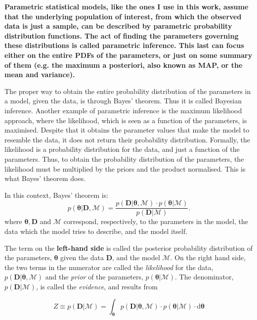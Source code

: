 \textbf{Parametric statistical models, like the ones I use in this work, assume that the underlying population of interest, from which the observed data is just a sample, can be described by parametric probability distribution functions. The act of finding the parameters governing these distributions is called parametric inference. This last can focus either on the entire PDFs of the parameters, or just on some summary of them (e.g. the maximum a posteriori, also known as MAP, or the mean and variance).}

The proper way to obtain the entire probability distribution of the parameters in a model, given the data, is through Bayes' theorem. Thus it is called Bayesian inference. Another example of parametric inference is the maximum likelihood approach, where the likelihood, which is seen as a function of the parameters, is maximised. Despite that it obtains the parameter values that make the model to resemble the data, it does not return their probability distribution. Formally, the likelihood is a probability distribution for the data, and just a function of the parameters. Thus, to obtain the probability distribution of the parameters, the likelihood must be multiplied by the priors and the product normalised. This is what Bayes' theorem does.

In this context, Bayes' theorem is:
\begin{equation}
p(\mathbf{\theta}|\mathbf{D},\mathcal{M}) = \frac{p(\mathbf{D}|\mathbf{\theta},\mathcal{M})\cdot p(\mathbf{\theta}|\mathcal{M})}{p(\mathbf{D}|\mathcal{M})}.
\end{equation}
where $\mathbf{\theta},\mathbf{D}$ and $\mathcal{M}$ correspond, respectively, to the parameters in the model, the data which the model tries to describe, and the model itself. 

The term on the \textbf{left-hand side} is called the posterior probability distribution of the parameters, $\mathbf{\theta}$ given the data $\mathbf{D}$, and the model $\mathcal{M}$. On the right hand side, the two terms in the numerator are called the \emph{likelihood} for the data, $p(\mathbf{D}|\mathbf{\theta},\mathcal{M})$ and the \emph{prior} of the parameters, $p(\mathbf{\theta}|\mathcal{M})$. The denominator, $p(\mathbf{D}|\mathcal{M})$, is called the \emph{evidence}, and results from

\begin{equation}
\label{eq:evidence}
Z \equiv p(\mathbf{D}|\mathcal{M}) = \int_{\mathbf{\theta}} p(\mathbf{D}|\mathbf{\theta},\mathcal{M})\cdot p(\mathbf{\theta}|\mathcal{M})\cdot \mathrm{d}\mathbf{\theta}
\end{equation} 

